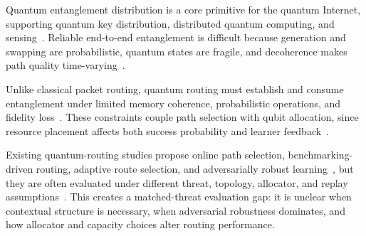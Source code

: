 \documentclass[10pt,conference]{IEEEtran}
\begin{document}
Quantum entanglement distribution is a core primitive for the quantum Internet, supporting quantum key distribution, distributed quantum computing, and sensing~\cite{kimble2008quantum,wehner2018quantum,pompili2021realization}. Reliable end-to-end entanglement is difficult because generation and swapping are probabilistic, quantum states are fragile, and decoherence makes path quality time-varying~\cite{briegel1998quantum,dahlberg2021netsquid,zukowski1993event}.

Unlike classical packet routing, quantum routing must establish and consume entanglement under limited memory coherence, probabilistic operations, and fidelity loss~\cite{bennett1993teleporting,zukowski1993event}. These constraints couple path selection with qubit allocation, since resource placement affects both success probability and learner feedback~\cite{li2025multipath,wang2025learning,huang2024quantum}.

Existing quantum-routing studies propose online path selection, benchmarking-driven routing, adaptive route selection, and adversarially robust learning~\cite{wang2025learning,coopmans2021benchmark,huang2024quantum}, but they are often evaluated under different threat, topology, allocator, and replay assumptions~\cite{liu2024qbgp,li2025multipath,chaudhary2023quantum}. This creates a matched-threat evaluation gap: it is unclear when contextual structure is necessary, when adversarial robustness dominates, and how allocator and capacity choices alter routing performance.
\end{document}
